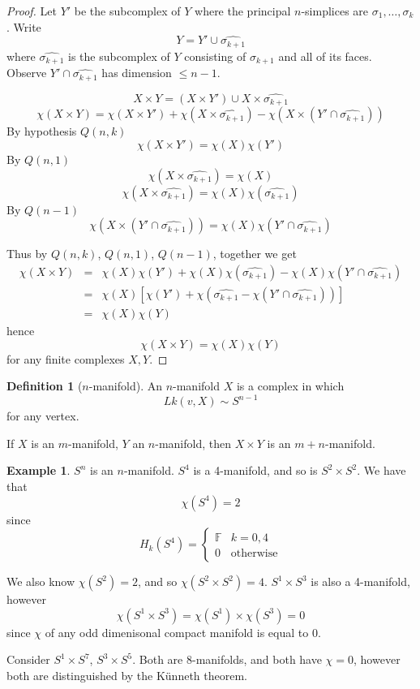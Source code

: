 \documentclass[a4paper,14pt]{extarticle}
\theoremstyle{definition}
\newtheorem*{definition}{Definition}
\newtheorem*{eg}{Example}
\begin{document}
\begin{proof}
	\vspace{12pt}

	Let $Y'$ be the subcomplex of $Y$ where the principal $n$-simplices are 
	$\sigma_1,\ldots,\sigma_k$. Write \[Y=Y'\cup\hat{\sigma_{k+1}}\] where 
	$\hat{\sigma_{k+1}}$ is the subcomplex of $Y$ consisting of $\sigma_{k+1}$ and all
	of its faces. Observe $Y'\cap\hat{\sigma_{k+1}}$ has dimension $\leq n-1$.

	\[X\times Y=(X\times Y')\cup X\times\hat{\sigma_{k+1}}\]
	\[\chi(X\times Y)=\chi(X\times Y')+\chi(X\times\hat{\sigma_{k+1}})-
	\chi(X\times(Y'\cap\hat{\sigma_{k+1}}))\]
	By hypothesis $Q(n,k)$ \[\chi(X\times Y')=\chi(X)\chi(Y')\]
	By $Q(n,1)$ \[\chi(X\times\hat{\sigma_{k+1}})=\chi(X)\]
	\[\chi(X\times\hat{\sigma_{k+1}})=\chi(X)\chi(\hat{\sigma_{k+1}})\]
	By $Q(n-1)$ \[\chi(X\times(Y'\cap\hat{\sigma_{k+1}}))=\chi(X)\chi(Y'\cap\hat{\sigma_{k+1}})\]

	Thus by $Q(n,k)$, $Q(n,1)$, $Q(n-1)$, together we get 
	\begin{eqnarray*}
		\chi(X\times Y)&=&\chi(X)\chi(Y')+\chi(X)\chi(\hat{\sigma_{k+1}})-\chi(X)\chi(Y'\cap
		\hat{\sigma_{k+1}}) \\
		&=& \chi(X)[\chi(Y')+\chi(\hat{\sigma_{k+1}}-\chi(Y'\cap\hat{\sigma_{k+1}}))] \\
		&=& \chi(X)\chi(Y)
	\end{eqnarray*}
	hence \[\chi(X\times Y)=\chi(X)\chi(Y)\] for any finite complexes $X, Y$.
\end{proof}

\begin{definition}[$n$-manifold]
	An $n$-manifold $X$ is a complex in which \[Lk(v,X)\sim S^{n-1}\] for any vertex.
\end{definition}

If $X$ is an $m$-manifold, $Y$ an $n$-manifold, then $X\times Y$ is an $m+n$-manifold.

\begin{eg}
	$S^n$ is an $n$-manifold. $S^4$ is a 4-manifold, and so is $S^2\times S^2$. We have that 
	\[\chi(S^4)=2\] since \[H_k(S^4)=\begin{cases}
		\mathbb{F} & k=0,4 \\ 0 & \text{otherwise}
	\end{cases}\]

	We also know $\chi(S^2)=2$, and so $\chi(S^2\times S^2)=4$. $S^1\times S^3$ is also a 
	4-manifold, however \[\chi(S^1\times S^3)=\chi(S^1)\times\chi(S^3)=0\]
	since $\chi$ of any odd dimenisonal compact manifold is equal to $0$.
	
	\vspace{12pt}

	Consider $S^1\times S^7$, $S^3\times S^5$. Both are $8$-manifolds, and both have 
	$\chi=0$, however both are distinguished by the Künneth theorem.
\end{eg}
\end{document}
